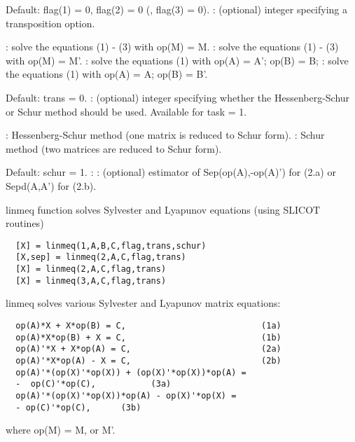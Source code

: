 \begin{parameters}
\begin{varlist}
\begin{varlist}
\begin{varlist}
      \end{varlist}
    \end{varlist}
    Default:    flag(1) = 0, flag(2) = 0 (, flag(3) = 0).
    : (optional) integer specifying a transposition option.
    \begin{varlist}
      : solve the equations (1) - (3) with op(M) = M.
      : solve the equations (1) - (3) with op(M) = M'.
      : solve the equations (1) with op(A) = A';  op(B) = B;
      : solve the equations (1) with op(A) = A;   op(B) = B'.
    \end{varlist}
    Default: trans = 0.
    : (optional) integer specifying whether the Hessenberg-Schur or Schur method should be used. Available for task = 1.
    \begin{varlist}
      : Hessenberg-Schur method (one matrix is reduced to Schur form).
      : Schur method (two matrices are reduced to Schur form).
    \end{varlist}
    Default:    schur = 1.
    :
    : (optional) estimator of Sep(op(A),-op(A)') for (2.a) or Sepd(A,A') for (2.b).
  \end{varlist}
\end{parameters}
\begin{mandescription}
  linmeq function solves Sylvester and Lyapunov equations (using SLICOT routines)
\begin{verbatim}
  [X] = linmeq(1,A,B,C,flag,trans,schur)
  [X,sep] = linmeq(2,A,C,flag,trans)
  [X] = linmeq(2,A,C,flag,trans)
  [X] = linmeq(3,A,C,flag,trans)
\end{verbatim}
linmeq solves various Sylvester and Lyapunov matrix equations:
\begin{verbatim}
  op(A)*X + X*op(B) = C,                           (1a)
  op(A)*X*op(B) + X = C,                           (1b)
  op(A)'*X + X*op(A) = C,                          (2a)
  op(A)'*X*op(A) - X = C,                          (2b)
  op(A)'*(op(X)'*op(X)) + (op(X)'*op(X))*op(A) =
  -  op(C)'*op(C),           (3a)
  op(A)'*(op(X)'*op(X))*op(A) - op(X)'*op(X) =
  - op(C)'*op(C),      (3b)
\end{verbatim}
where op(M) = M, or M'.
\end{mandescription}
